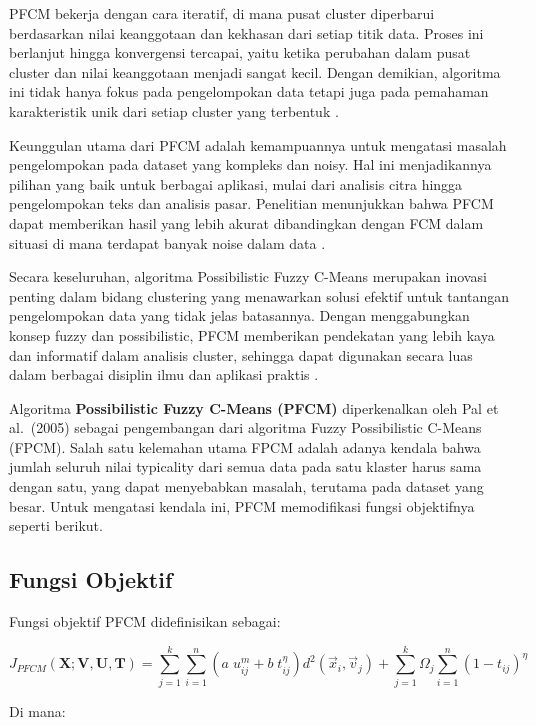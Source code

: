 \documentclass[
  oneside]{book}
\begin{document}
PFCM bekerja dengan cara iteratif, di mana pusat cluster diperbarui berdasarkan nilai keanggotaan dan kekhasan dari setiap titik data. Proses ini berlanjut hingga konvergensi tercapai, yaitu ketika perubahan dalam pusat cluster dan nilai keanggotaan menjadi sangat kecil. Dengan demikian, algoritma ini tidak hanya fokus pada pengelompokan data tetapi juga pada pemahaman karakteristik unik dari setiap cluster yang terbentuk \citep{Bora2014}.

Keunggulan utama dari PFCM adalah kemampuannya untuk mengatasi masalah pengelompokan pada dataset yang kompleks dan noisy. Hal ini menjadikannya pilihan yang baik untuk berbagai aplikasi, mulai dari analisis citra hingga pengelompokan teks dan analisis pasar. Penelitian menunjukkan bahwa PFCM dapat memberikan hasil yang lebih akurat dibandingkan dengan FCM dalam situasi di mana terdapat banyak noise dalam data \citep{Phukon2013}.

Secara keseluruhan, algoritma Possibilistic Fuzzy C-Means merupakan inovasi penting dalam bidang clustering yang menawarkan solusi efektif untuk tantangan pengelompokan data yang tidak jelas batasannya. Dengan menggabungkan konsep fuzzy dan possibilistic, PFCM memberikan pendekatan yang lebih kaya dan informatif dalam analisis cluster, sehingga dapat digunakan secara luas dalam berbagai disiplin ilmu dan aplikasi praktis \citep{Dwi2017}.

Algoritma \textbf{Possibilistic Fuzzy C-Means (PFCM)} diperkenalkan oleh Pal et al.~(2005) sebagai pengembangan dari algoritma Fuzzy Possibilistic C-Means (FPCM). Salah satu kelemahan utama FPCM adalah adanya kendala bahwa jumlah seluruh nilai typicality dari semua data pada satu klaster harus sama dengan satu, yang dapat menyebabkan masalah, terutama pada dataset yang besar. Untuk mengatasi kendala ini, PFCM memodifikasi fungsi objektifnya seperti berikut.

\subsection*{Fungsi Objektif}\label{fungsi-objektif}

Fungsi objektif PFCM didefinisikan sebagai:

\[
J_{PFCM}(\mathbf{X}; \mathbf{V}, \mathbf{U}, \mathbf{T}) = \sum_{j=1}^k \sum_{i=1}^n \left( a \; u_{ij}^m + b \; t_{ij}^\eta \right) d^2(\vec{x}_i, \vec{v}_j) + \sum_{j=1}^k \Omega_j \sum_{i=1}^n (1-t_{ij})^\eta
\]

Di mana:
\end{document}
